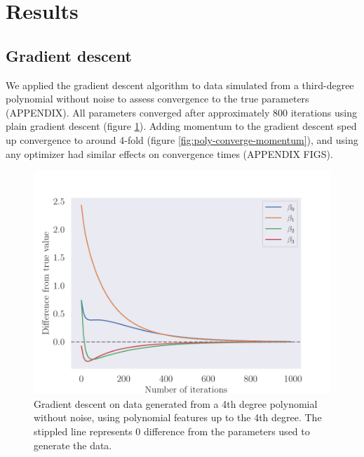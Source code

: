 \section{Results}\label{sec:results}

\subsection{Gradient descent}

We applied the gradient descent algorithm to data simulated from a third-degree polynomial without noise to assess convergence to the true parameters (APPENDIX). All parameters converged after approximately 800 iterations using plain gradient descent (figure \ref{fig:poly-converge}). Adding momentum to the gradient descent sped up convergence to around 4-fold (figure \ref{fig:poly-converge-momentum}), and using any optimizer had similar effects on convergence times (APPENDIX FIGS).

\begin{figure}
    \centering
    \includegraphics[width=0.99\linewidth]{examples/tests_even/figs/gradient-descent-polynomial-convergence.pdf}
    \caption{Gradient descent on data generated from a 4th degree polynomial without noise, using polynomial features up to the 4th degree. The stippled line represents 0 difference from the parameters used to generate the data.}
    \label{fig:poly-converge}
\end{figure}

